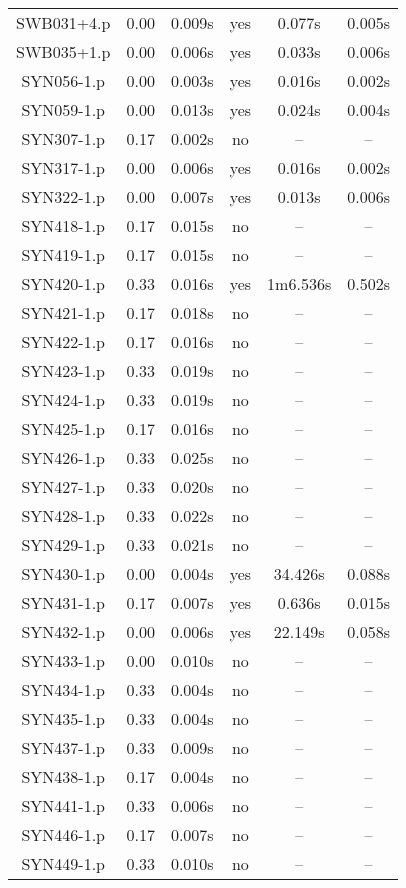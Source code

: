\begin{longtable}{||c | c | c | c | c | c||}
SWB031+4.p & 0.00 & 0.009s & yes & 0.077s & 0.005s \\
SWB035+1.p & 0.00 & 0.006s & yes & 0.033s & 0.006s \\
SYN056-1.p & 0.00 & 0.003s & yes & 0.016s & 0.002s \\
SYN059-1.p & 0.00 & 0.013s & yes & 0.024s & 0.004s \\
SYN307-1.p & 0.17 & 0.002s & no & -- & -- \\
SYN317-1.p & 0.00 & 0.006s & yes & 0.016s & 0.002s \\
SYN322-1.p & 0.00 & 0.007s & yes & 0.013s & 0.006s \\
SYN418-1.p & 0.17 & 0.015s & no & -- & -- \\
SYN419-1.p & 0.17 & 0.015s & no & -- & -- \\
SYN420-1.p & 0.33 & 0.016s & yes & 1m6.536s & 0.502s \\
SYN421-1.p & 0.17 & 0.018s & no & -- & -- \\
SYN422-1.p & 0.17 & 0.016s & no & -- & -- \\
SYN423-1.p & 0.33 & 0.019s & no & -- & -- \\
SYN424-1.p & 0.33 & 0.019s & no & -- & -- \\
SYN425-1.p & 0.17 & 0.016s & no & -- & -- \\
SYN426-1.p & 0.33 & 0.025s & no & -- & -- \\
SYN427-1.p & 0.33 & 0.020s & no & -- & -- \\
SYN428-1.p & 0.33 & 0.022s & no & -- & -- \\
SYN429-1.p & 0.33 & 0.021s & no & -- & -- \\
SYN430-1.p & 0.00 & 0.004s & yes & 34.426s & 0.088s \\
SYN431-1.p & 0.17 & 0.007s & yes & 0.636s & 0.015s \\
SYN432-1.p & 0.00 & 0.006s & yes & 22.149s & 0.058s \\
SYN433-1.p & 0.00 & 0.010s & no & -- & -- \\
SYN434-1.p & 0.33 & 0.004s & no & -- & -- \\
SYN435-1.p & 0.33 & 0.004s & no & -- & -- \\
SYN437-1.p & 0.33 & 0.009s & no & -- & -- \\
SYN438-1.p & 0.17 & 0.004s & no & -- & -- \\
SYN441-1.p & 0.33 & 0.006s & no & -- & -- \\
SYN446-1.p & 0.17 & 0.007s & no & -- & -- \\
SYN449-1.p & 0.33 & 0.010s & no & -- & -- \\

\end{longtable}
